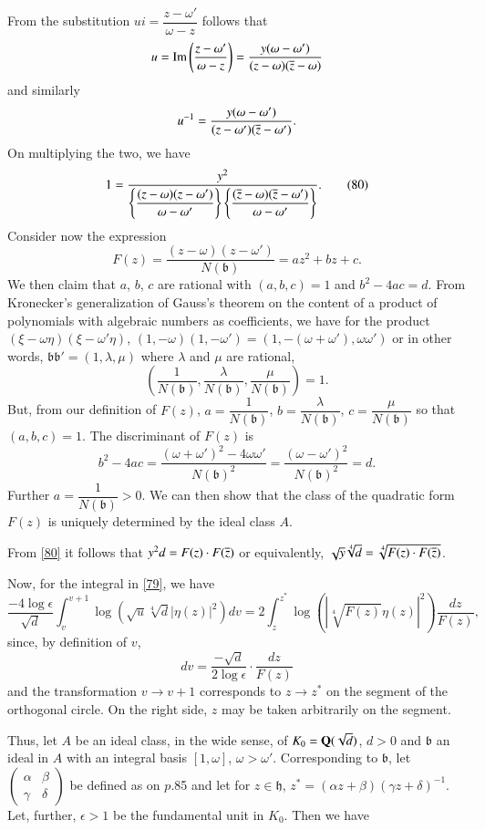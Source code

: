 From the substitution $ui=\dfrac{z-\omega'}{\omega-z}$ follows that
$$
u=\operatorname{Im}\left(\dfrac{z-\omega'}{\omega-z}\right)=\frac{y(\omega-\omega')}{(z-\omega)(\overline{z}-\omega)} 
$$
and similarly
$$
u^{-1}=\frac{y(\omega-\omega')}{(z-\omega')(\overline{z}-\omega')}.
$$
On multiplying the two, we have
\begin{equation*}
1=\frac{y^{2}}{\left\{\dfrac{(z-\omega)(z-\omega')}{\omega-\omega'}\right\}\left\{\dfrac{(\overline{z}-\omega)(\overline{z}-\omega')}{\omega-\omega'}\right\}}.\tag{80}\label{80} 
\end{equation*}
Consider now the expression
\begin{equation*}
F(z)=\frac{(z-\omega)(z-\omega')}{N(\mathfrak{b})}=az^{2}+bz+c.\tag{81}\label{81} 
\end{equation*}
We then claim that $a$, $b$, $c$ are rational with $(a,b,c)=1$ and
$b^{2}-4ac=d$. From Kronecker's generalization of Gauss's theorem on
the content of a product of polynomials with algebraic numbers as
coefficients, we have for the product
$(\xi-\omega\eta)(\xi-\omega'\eta)$,
$(1,-\omega)(1,-\omega')=(1,-(\omega+\omega'),\omega\omega')$ or in
other words, $\mathfrak{bb}'=(1,\lambda,\mu)$ where $\lambda$ and
$\mu$ are rational, \ie
$$
\left(\frac{1}{N(\mathfrak{b})},\frac{\lambda}{N(\mathfrak{b})},\frac{\mu}{N(\mathfrak{b})}\right)=1. 
$$
But, from our definition of $F(z)$, $a=\dfrac{1}{N(\mathfrak{b})}$,
$b=\dfrac{\lambda}{N(\mathfrak{b})}$, $c=\dfrac{\mu}{N(\mathfrak{b})}$
so that $(a,b,c)=1$. The discriminant of $F(z)$ is 
$$
b^{2}-4ac=\frac{(\omega+\omega')^{2}-4\omega\omega'}{N(\mathfrak{b})^{2}}=\frac{(\omega-\omega')^{2}}{N(\mathfrak{b})^{2}}=d.
$$\pageoriginale
Further $a=\dfrac{1}{N(\mathfrak{b})}>0$. We can then show that the
class of the quadratic form $F(z)$ is uniquely determined by the ideal
class $A$.

From \eqref{80} it follows that $y^{2}d=F(z)\cdot F(\overline{z})$ or
equivalently, $\sqrt{y}\sqrt[4]{d}=\sqrt[4]{F(z)\cdot F(\overline{z})}$.

Now, for the integral in \eqref{79}, we have
$$
\frac{-4\log
  \epsilon}{\sqrt{d}}\int^{v+1}_{v}\log(\sqrt{u}\sqrt[4]{d}|\eta(z)|^{2})dv=2\int^{z^{\ast}}_{z}\log(|\sqrt[4]{F(z)}\eta(z)|^{2})\dfrac{dz}{F(z)},
$$
since, by definition of $v$,
$$
dv=\frac{-\sqrt{d}}{2\log \epsilon}\cdot \frac{dz}{F(z)}
$$
and the transformation $v\to v+1$ corresponds to $z\to z^{\ast}$ on
the segment of the orthogonal circle. On the right side, $z$ may be
taken arbitrarily on the segment.

Thus, let $A$ be an ideal class, in the wide sense, of
$K_{0}=\mathbf{Q}(\sqrt{d})$, $d>0$ and $\mathfrak{b}$ an ideal in $A$ with
an integral basis $[1,\omega]$, $\omega>\omega'$. Corresponding to
$\mathfrak{b}$, let $\left(\begin{smallmatrix}\alpha & \beta \\ \gamma
  & \delta\end{smallmatrix}\right)$ be defined as on $p$.\@ 85 and let
  for $z\in \mathfrak{h}$, $z^{\ast}=(\alpha z+\beta)(\gamma
  z+\delta)^{-1}$. Let, further, $\epsilon>1$ be the fundamental unit
  in $K_{0}$. Then we have

